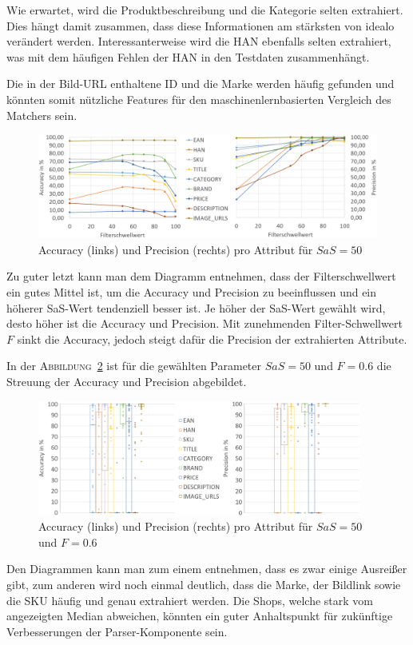 Wie erwartet, wird die Produktbeschreibung und die Kategorie selten extrahiert.
Dies hängt damit zusammen, dass diese Informationen am stärksten von idealo verändert werden.
Interessanterweise wird die HAN ebenfalls selten extrahiert, was mit dem häufigen Fehlen der HAN in den
Testdaten zusammenhängt.

Die in der Bild-URL enthaltene ID und die Marke werden häufig gefunden und könnten somit nützliche Features
für den maschinenlernbasierten Vergleich des Matchers sein.

\begin{figure}[H]
    \centering
    \includegraphics[width=\textwidth]{resources/accuracy-and-precision-per-attribute.PNG}
    \caption{Accuracy (links) und Precision (rechts) pro Attribut für $SaS=50$}
    \label{abb:accuracy-precision-chart}
    \vspace{-0.5cm}
\end{figure}

Zu guter letzt kann man dem Diagramm entnehmen, dass der Filterschwellwert ein gutes Mittel ist, um die Accuracy und
Precision zu beeinflussen und ein höherer SaS-Wert tendenziell besser ist.
Je höher der SaS-Wert gewählt wird, desto höher ist die Accuracy und Precision.
Mit zunehmenden Filter-Schwellwert $F$ sinkt die Accuracy, jedoch steigt dafür die Precision der extrahierten Attribute.

In der \textsc{Abbildung}~\ref{abb:accuracy-precision-box-plot} ist für die gewählten Parameter $SaS=50$ und $F=0.6$
die Streuung der Accuracy und Precision abgebildet.
\begin{figure}[h]
    \centering
    \includegraphics[width=0.95\textwidth]{resources/accuracy-and-precision-box-plots.png}
    \caption{Accuracy (links) und Precision (rechts) pro Attribut für $SaS=50$ und $F=0.6$}
    \label{abb:accuracy-precision-box-plot}
    \vspace{-0.25cm}
\end{figure}
Den Diagrammen kann man zum einem entnehmen, dass es zwar einige Ausreißer gibt, zum anderen wird noch einmal
deutlich, dass die Marke, der Bildlink sowie die SKU häufig und genau extrahiert werden.
Die Shops, welche stark vom angezeigten Median abweichen, könnten ein guter Anhaltspunkt für zukünftige Verbesserungen
der Parser-Komponente sein.
\vspace{-0.25cm}
